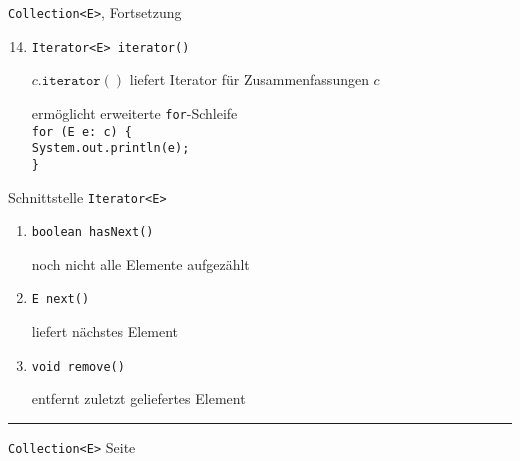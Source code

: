 \documentclass{slides}
\newcounter{mypage}
\begin{document}
\begin{slide}{}
\normalsize

\begin{center}
\texttt{Collection<E>}, Fortsetzung
\end{center}
\vspace*{0.5cm}

\footnotesize
\begin{enumerate}
\setcounter{enumi}{13}
\item \texttt{Iterator<E> iterator()}

      $c.\mathtt{iterator}()$ liefert Iterator f\"ur Zusammenfassungen $c$

      erm\"oglicht erweiterte \texttt{for}-Schleife
      \\[0.2cm]
      \hspace*{1.3cm} \texttt{for (E e: c) \{} \\
      \hspace*{2.3cm} \texttt{System.out.println(e);} \\
      \hspace*{1.3cm} \texttt{\}} 
\end{enumerate}
\vspace*{0.5cm}

\begin{center}
Schnittstelle \texttt{Iterator<E>}
\end{center}
\vspace*{0.5cm}

\begin{enumerate}
\item \texttt{boolean hasNext()}

      noch nicht alle Elemente aufgez\"ahlt
\item \texttt{E next()}

      liefert n\"achstes Element
\item \texttt{void remove()}

      entfernt zuletzt geliefertes Element 
\end{enumerate}

\vspace*{\fill}
\tiny \addtocounter{mypage}{1}
\rule{17cm}{1mm}
\texttt{Collection<E>} \hspace*{\fill} Seite 
\end{slide}


\end{document}
